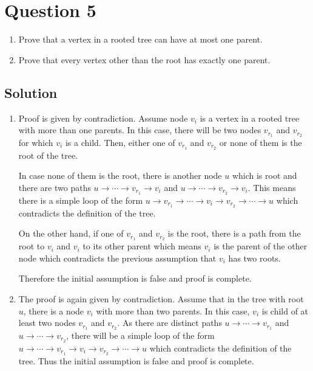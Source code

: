 
\section*{Question 5}
\begin{enumerate}
\item Prove that a vertex in a rooted tree can have at most one parent.
\item Prove that every vertex other than the root has exactly one parent.
\end{enumerate}
\subsection*{Solution}
\begin{enumerate}
\item Proof is given by contradiction. Assume node $v_i$ is a vertex in a rooted tree with more than one parents. In this case, there will be two nodes $v_{r_1}$ and $v_{r_2}$ for which $v_i$ is a child. Then, either one of $v_{r_1}$ and $v_{r_2}$ or none of them is the root of the tree.

In case none of them is the root, there is another node $u$ which is root and there are two paths $u \rightarrow \cdots \rightarrow v_{r_1} \rightarrow v_i$ and $u \rightarrow \cdots \rightarrow v_{r_2} \rightarrow v_i$. This means there is a simple loop of the form $u \rightarrow v_{r_1} \rightarrow \cdots \rightarrow v_i \rightarrow v_{r_2} \rightarrow \cdots \rightarrow u$ which contradicts the definition of the tree.

On the other hand, if one of $v_{r_1}$ and $v_{r_2}$ is the root, there is a path from the root to $v_i$ and $v_i$ to its other parent which means $v_i$ is the parent of the other node which contradicts the previous assumption that $v_i$ has two roots.

Therefore the initial assumption is false and proof is complete.

\item The proof is again given by contradiction. Assume that in the tree with root $u$, there is a node $v_i$ with more than two parents. In this case, $v_i$ is child of at least two nodes $v_{r_1}$ and $v_{r_2}$. As there are distinct paths $u \rightarrow \cdots \rightarrow v_{r_1}$ and $u \rightarrow \cdots \rightarrow v_{r_2}$, there will be a simple loop of the form $u \rightarrow \cdots \rightarrow v_{r_1} \rightarrow v_i \rightarrow v_{r_2} \rightarrow \cdots \rightarrow u$ which contradicts the definition of the tree. Thus the initial assumption is false and proof is complete.
\end{enumerate}
